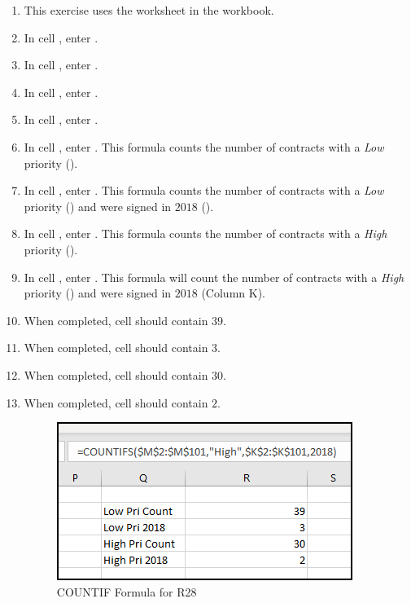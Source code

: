 \begin{enumerate}
	\item This exercise uses the  worksheet in the  workbook.
	\item In cell , enter .
	\item In cell , enter .
	\item In cell , enter .
	\item In cell , enter .
	\item In cell , enter . This formula counts the number of contracts with a \textit{Low} priority ().
	\item In cell , enter . This formula counts the number of contracts with a \textit{Low} priority () and were signed in $ 2018 $ ().
	\item In cell , enter . This formula counts the number of contracts with a \textit{High} priority ().
	\item In cell , enter . This formula will count the number of contracts with a \textit{High} priority () and were signed in $ 2018 $ (Column K).
	\item When completed, cell  should contain $ 39 $.
	\item When completed, cell  should contain $ 3 $.
	\item When completed, cell  should contain $ 30 $.
	\item When completed, cell  should contain $ 2 $.
	
	\begin{figure}[H]
		\centering
		\includegraphics[width=\maxwidth{.75\linewidth}]{gfx/ch09_fig43}
		\caption{COUNTIF Formula for R28}
		\label{09:fig43}
	\end{figure}
		
\end{enumerate}

